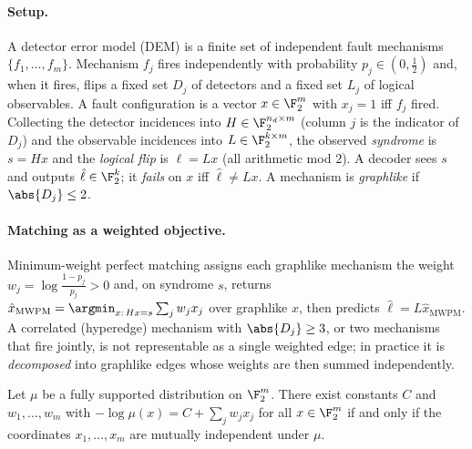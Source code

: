 
\paragraph{Setup.}
A detector error model (DEM) is a finite set of independent fault mechanisms
$\{f_1,\dots,f_m\}$. Mechanism $f_j$ fires independently with probability
$p_j\in(0,\tfrac12)$ and, when it fires, flips a fixed set $D_j$ of detectors and
a fixed set $L_j$ of logical observables. A fault configuration is a vector
$x\in\F_2^m$ with $x_j=1$ iff $f_j$ fired. Collecting the detector incidences into
$H\in\F_2^{n_d\times m}$ (column $j$ is the indicator of $D_j$) and the
observable incidences into $L\in\F_2^{k\times m}$, the observed \emph{syndrome}
is $s=Hx$ and the \emph{logical flip} is $\ell=Lx$ (all arithmetic mod $2$). A
decoder sees $s$ and outputs $\hat\ell\in\F_2^{k}$; it \emph{fails} on $x$ iff
$\hat\ell\neq Lx$. A mechanism is \emph{graphlike} if $\abs{D_j}\le 2$.

\paragraph{Matching as a weighted objective.}
Minimum-weight perfect matching assigns each graphlike mechanism the weight
$w_j=\log\frac{1-p_j}{p_j}>0$ and, on syndrome $s$, returns
$\hat x_{\mathrm{MWPM}}=\argmin_{x:\,Hx=s}\sum_j w_j x_j$ over graphlike $x$, then
predicts $\hat\ell=L\hat x_{\mathrm{MWPM}}$. A correlated (hyperedge) mechanism
with $\abs{D_j}\ge 3$, or two mechanisms that fire jointly, is not representable
as a single weighted edge; in practice it is \emph{decomposed} into graphlike
edges whose weights are then summed independently.

\begin{lemma}
\label{lem:additive}
Let $\mu$ be a fully supported distribution on $\F_2^m$. There exist constants
$C$ and $w_1,\dots,w_m$ with $-\log\mu(x)=C+\sum_{j}w_j x_j$ for all $x\in\F_2^m$
if and only if the coordinates $x_1,\dots,x_m$ are mutually independent under
$\mu$.
\end{lemma}

